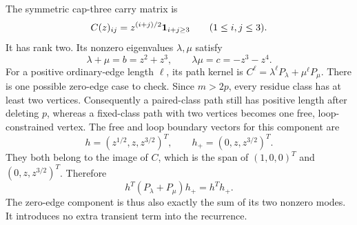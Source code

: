 \documentclass[11pt]{amsart}
\theoremstyle{definition}
\theoremstyle{remark}
\numberwithin{equation}{section}
\begin{document}
The symmetric cap-three carry matrix is
\[
 C(z)_{ij}=z^{(i+j)/2}{\bf1}_{i+j\ge3}\qquad(1\le i,j\le3).
\]
It has rank two.  Its nonzero eigenvalues $\lambda,\mu$ satisfy
\begin{equation}\label{raw:eigenvalues}
 \lambda+\mu=b=z^2+z^3,\qquad
 \lambda\mu=c=-z^3-z^4.
\end{equation}
For a positive ordinary-edge length $\ell$, its path kernel is
$C^\ell=\lambda^\ell P_\lambda+\mu^\ell P_\mu$.
There is one possible zero-edge case to check.  Since $m>2p$, every
residue class has at least two vertices.  Consequently a paired-class
path still has positive length after deleting $p$, whereas a fixed-class
path with two vertices becomes one free, loop-constrained vertex.
The free and loop boundary vectors for this component are
\[
 h=(z^{1/2},z,z^{3/2})^T,\qquad h_+=(0,z,z^{3/2})^T.
\]
They both belong to the image of $C$, which is the span of
$(1,0,0)^T$ and $(0,z,z^{3/2})^T$.  Therefore
\[
 h^T(P_\lambda+P_\mu)h_+=h^Th_+.
\]
The zero-edge component is thus also exactly the sum of its two
nonzero modes.  It introduces no extra transient term into the
recurrence.
\end{document}
